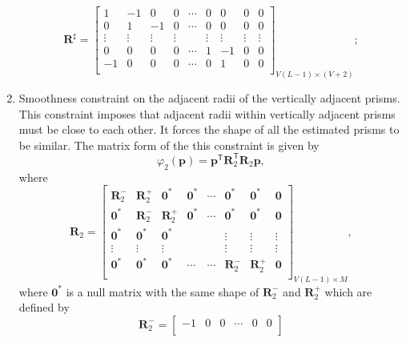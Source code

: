 \begin{enumerate}
\begin{equation}
\mathbf{R}^{\sharp} = 
\begin{bmatrix}
1 & -1 & 0 & 0 & \cdots & 0 & 0 & 0 & 0 \\
0 & 1 & -1 & 0 & \cdots & 0 & 0 & 0 & 0 \\
\vdots & \vdots & \vdots & \vdots & & \vdots & \vdots & \vdots & \vdots \\
0 & 0 & 0 & 0 & \cdots & 1 & -1 & 0 & 0 \\
-1 & 0 & 0 & 0 & \cdots & 0 & 1 & 0 & 0 \\
\end{bmatrix}_{V(L-1)\times (V+2)};
\end{equation}


\item Smoothness constraint on the adjacent radii of the vertically adjacent prisms. This constraint imposes that adjacent radii within vertically adjacent prisms must be close to each other. It forces the shape of all the estimated prisms to be similar. The matrix form of the this constraint is given by
\begin{equation}
\varphi_{2}(\mathbf{p}) = \mathbf{p}^\mathsf{T}\mathbf{R}^\mathsf{T}_{2}\mathbf{R}_{2}\mathbf{p} ,
\end{equation}
where
\begin{equation}
\mathbf{R}_{2} = 
\begin{bmatrix}
\mathbf{R}^{-}_{2} & \mathbf{R}^{+}_{2} & \mathbf{0}^{*} & \mathbf{0}^{*} & \cdots & \mathbf{0}^{*} & \mathbf{0}^{*} & \mathbf{0}\\
\mathbf{0}^{*} & \mathbf{R}^{-}_{2} & \mathbf{R}^{+}_{2} & \mathbf{0}^{*} & \cdots & \mathbf{0}^{*} & \mathbf{0}^{*} & \mathbf{0}\\
\mathbf{0}^{*} & \mathbf{0}^{*} & \mathbf{0}^{*} &  &  & \vdots & \vdots & \vdots\\
\vdots & \vdots & \vdots &  &  & \vdots & \vdots & \vdots\\
\mathbf{0}^{*} & \mathbf{0}^{*} & \mathbf{0}^{*} & \cdots & \cdots & \mathbf{R}^{-}_{2} & \mathbf{R}^{+}_{2} & \mathbf{0}\\
\end{bmatrix}_{V(L-1)\times M},
\end{equation}
where $\mathbf{0}^{*}$ is a null matrix with the same shape of $\mathbf{R}^{-}_2$ and $\mathbf{R}^{+}_2$ which are defined by 
\begin{equation}
\mathbf{R}^{-}_{2} = 
\begin{bmatrix}
-1 & 0 & 0 & \cdots & 0 & 0 \\

\end{bmatrix}
\end{equation}
\end{enumerate}
